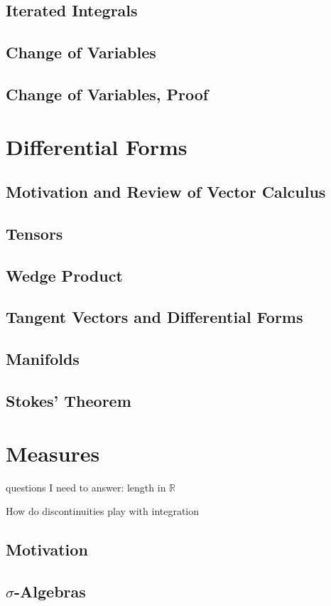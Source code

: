\documentclass{article}
\newcommand{\R}{\mathbb{R}}
\theoremstyle{definition}
\begin{document}
\subsection{Iterated Integrals}
\subsection{Change of Variables}
\subsection{Change of Variables, Proof}
\section{Differential Forms}
\subsection{Motivation and Review of Vector Calculus}
\subsection{Tensors}
\subsection{Wedge Product}
\subsection{Tangent Vectors and Differential Forms}
\subsection{Manifolds}
\subsection{Stokes' Theorem}
\section{Measures}
questions I need to answer: length in $ \R $

How do discontinuities play with integration
\subsection{Motivation}
\subsection{$ \sigma $-Algebras}
\end{document}
